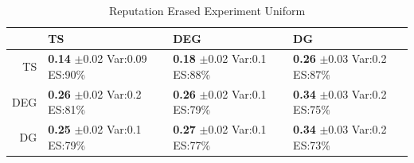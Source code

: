 \documentclass[11pt,letterpaper]{article}
\begin{document}
\begin{table}[H]
\centering
\caption{Reputation Erased Experiment Uniform} 
\begin{tabular}{rlll}
  \hline
 & TS & DEG &  DG \\ 
  \hline
TS & \makecell{\textbf{0.14} $\pm$0.02\\Var:0.09\\ES:90\%} & \makecell{\textbf{0.18} $\pm$0.02\\Var:0.1\\ES:88\%} & \makecell{\textbf{0.26} $\pm$0.03\\Var:0.2\\ES:87\%} \\ 
  DEG & \makecell{\textbf{0.26} $\pm$0.02\\Var:0.2\\ES:81\%} & \makecell{\textbf{0.26} $\pm$0.02\\Var:0.1\\ES:79\%} & \makecell{\textbf{0.34} $\pm$0.03\\Var:0.2\\ES:75\%} \\ 
   DG & \makecell{\textbf{0.25} $\pm$0.02\\Var:0.1\\ES:79\%} & \makecell{\textbf{0.27} $\pm$0.02\\Var:0.1\\ES:77\%} & \makecell{\textbf{0.34} $\pm$0.03\\Var:0.2\\ES:73\%} \\ 
   \hline
\end{tabular}
\end{table}
\end{document}
